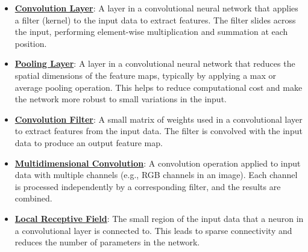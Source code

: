 \documentclass{article}%
\begin{document}
\begin{itemize}[leftmargin=*]
\item \href{https://purdue.brightspace.com/d2l/common/assets/pdfjs-d2l-dist/1.0.14-legacy/web/viewer.html?file=%2Fcontent%2Fenforced%2F1095467-wl.202510.CS.24300.001%2F09L1-cnn.pdf%3Fou%3D1095467&lang=en-us&container=d2l-fileviewer-rendered-pdf&fullscreen=d2l-fileviewer-rendered-pdf-dialog&height=667#page=6}{\textbf{Convolution Layer}}: A layer in a convolutional neural network that applies a filter (kernel) to the input data to extract features. The filter slides across the input, performing element-wise multiplication and summation at each position.%
\item \href{https://purdue.brightspace.com/d2l/common/assets/pdfjs-d2l-dist/1.0.14-legacy/web/viewer.html?file=%2Fcontent%2Fenforced%2F1095467-wl.202510.CS.24300.001%2F09L1-cnn.pdf%3Fou%3D1095467&lang=en-us&container=d2l-fileviewer-rendered-pdf&fullscreen=d2l-fileviewer-rendered-pdf-dialog&height=667#page=6}{\textbf{Pooling Layer}}: A layer in a convolutional neural network that reduces the spatial dimensions of the feature maps, typically by applying a max or average pooling operation. This helps to reduce computational cost and make the network more robust to small variations in the input.%
\item \href{https://purdue.brightspace.com/d2l/common/assets/pdfjs-d2l-dist/1.0.14-legacy/web/viewer.html?file=%2Fcontent%2Fenforced%2F1095467-wl.202510.CS.24300.001%2F09L1-cnn.pdf%3Fou%3D1095467&lang=en-us&container=d2l-fileviewer-rendered-pdf&fullscreen=d2l-fileviewer-rendered-pdf-dialog&height=667#page=6}{\textbf{Convolution Filter}}: A small matrix of weights used in a convolutional layer to extract features from the input data. The filter is convolved with the input data to produce an output feature map.%
\item \href{https://purdue.brightspace.com/d2l/common/assets/pdfjs-d2l-dist/1.0.14-legacy/web/viewer.html?file=%2Fcontent%2Fenforced%2F1095467-wl.202510.CS.24300.001%2F09L1-cnn.pdf%3Fou%3D1095467&lang=en-us&container=d2l-fileviewer-rendered-pdf&fullscreen=d2l-fileviewer-rendered-pdf-dialog&height=667#page=8}{\textbf{Multidimensional Convolution}}: A convolution operation applied to input data with multiple channels (e.g., RGB channels in an image). Each channel is processed independently by a corresponding filter, and the results are combined.%
\item \href{https://purdue.brightspace.com/d2l/common/assets/pdfjs-d2l-dist/1.0.14-legacy/web/viewer.html?file=%2Fcontent%2Fenforced%2F1095467-wl.202510.CS.24300.001%2F09L1-cnn.pdf%3Fou%3D1095467&lang=en-us&container=d2l-fileviewer-rendered-pdf&fullscreen=d2l-fileviewer-rendered-pdf-dialog&height=667#page=10}{\textbf{Local Receptive Field}}: The small region of the input data that a neuron in a convolutional layer is connected to. This leads to sparse connectivity and reduces the number of parameters in the network.%

\end{itemize}
\end{document}
